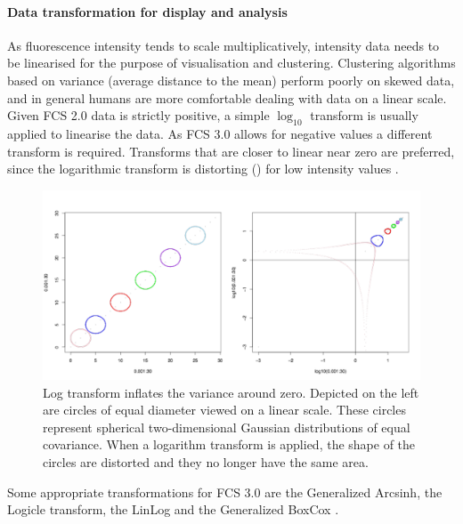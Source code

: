\paragraph{Data transformation for display and analysis}
As fluorescence intensity tends to scale multiplicatively, intensity data needs to be linearised for the purpose of visualisation and clustering.
Clustering algorithms based on variance (average distance to the mean) perform poorly on skewed data, and in general humans are more comfortable dealing
with data on a linear scale.
Given FCS 2.0 data is strictly positive, a simple $\log_{10}$ transform is usually applied to linearise the data.
As FCS 3.0 allows for negative values a different transform is required.
Transforms that are closer to linear near zero are preferred, 
since the logarithmic transform is distorting ()
for low intensity values \citep{Durbin:2002tj,Tung:2006uw}.
\begin{figure}
\centering
\includegraphics[scale=.5] {figures/log10-deform.pdf}
{Log transform inflates the variance around zero.}
{
  Depicted on the left are circles of equal diameter viewed on a linear scale.
  These circles represent spherical two-dimensional Gaussian distributions of equal covariance.
  When a logarithm transform is applied, the shape of the circles are distorted and they no longer have the same area.
}
\end{figure}
Some appropriate transformations for FCS 3.0 are the Generalized Arcsinh, the Logicle transform,
the LinLog and the Generalized BoxCox \citep{Bagwell:2005he,Parks:2006gaa,Finak:2010is}.
